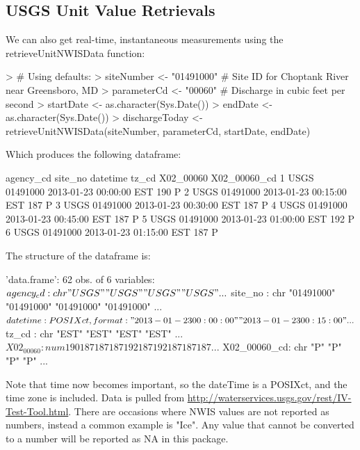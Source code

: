 \documentclass[a4paper,11pt]{article}
\begin{document}
\subsection{USGS Unit Value Retrievals}
We can also get real-time, instantaneous measurements using the retrieveUnitNWISData function:
\begin{Schunk}
\begin{Sinput}
> # Using defaults:
> siteNumber <- "01491000" # Site ID for Choptank River near Greensboro, MD
> parameterCd <- "00060"  # Discharge in cubic feet per second
> startDate <- as.character(Sys.Date())
> endDate <- as.character(Sys.Date())
> dischargeToday <- retrieveUnitNWISData(siteNumber, parameterCd, startDate, endDate)
\end{Sinput}
\end{Schunk}
Which produces the following dataframe:
\begin{Schunk}
\begin{Soutput}
  agency_cd  site_no            datetime tz_cd X02_00060 X02_00060_cd
1      USGS 01491000 2013-01-23 00:00:00   EST       190            P
2      USGS 01491000 2013-01-23 00:15:00   EST       187            P
3      USGS 01491000 2013-01-23 00:30:00   EST       187            P
4      USGS 01491000 2013-01-23 00:45:00   EST       187            P
5      USGS 01491000 2013-01-23 01:00:00   EST       192            P
6      USGS 01491000 2013-01-23 01:15:00   EST       187            P
\end{Soutput}
\end{Schunk}
The structure of the dataframe is:
\begin{Schunk}
\begin{Soutput}
'data.frame':	62 obs. of  6 variables:
 $ agency_cd   : chr  "USGS" "USGS" "USGS" "USGS" ...
 $ site_no     : chr  "01491000" "01491000" "01491000" "01491000" ...
 $ datetime    : POSIXct, format: "2013-01-23 00:00:00" "2013-01-23 00:15:00" ...
 $ tz_cd       : chr  "EST" "EST" "EST" "EST" ...
 $ X02_00060   : num  190 187 187 187 192 187 192 187 187 187 ...
 $ X02_00060_cd: chr  "P" "P" "P" "P" ...
\end{Soutput}
\end{Schunk}
Note that time now becomes important, so the dateTime is a POSIXct, and the time zone is included. Data is pulled from \url{http://waterservices.usgs.gov/rest/IV-Test-Tool.html}. There are occasions where NWIS values are not reported as numbers, instead a common example is "Ice".  Any value that cannot be converted to a number will be reported as NA in this package.
\end{document}
